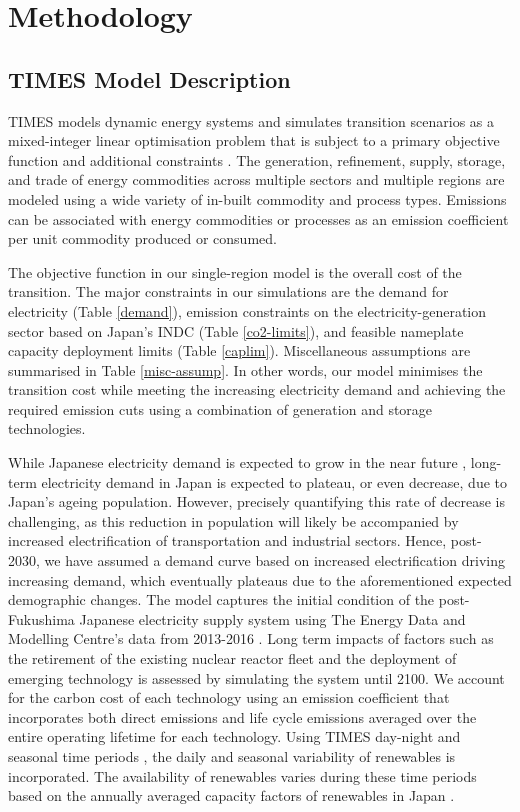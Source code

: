 \section{Methodology} \label{method}
\subsection{TIMES Model Description}
\gls{TIMES} models dynamic energy systems and simulates transition scenarios as a mixed-integer linear optimisation problem that is subject to a primary objective function and additional constraints \cite{loulou_etsap-tiam_2008}. The generation, refinement, supply, storage, and trade of energy commodities across multiple sectors and multiple regions are modeled using a wide variety of in-built commodity and process types. Emissions can be associated with energy commodities or processes as an emission coefficient per unit commodity produced or consumed. 

The objective function in our single-region model is the overall cost of the transition. The major constraints in our simulations are the demand for electricity (Table \ref{demand}), emission constraints on the electricity-generation sector based on Japan's \gls{INDC} (Table \ref{co2-limits}), and feasible nameplate capacity deployment limits (Table \ref{caplim}). Miscellaneous assumptions are summarised in Table \ref{misc-assump}. In other words, our model minimises the transition cost while meeting the increasing electricity demand and achieving the required emission cuts using a combination of generation and storage technologies. 

While Japanese electricity demand is expected to grow in the near future  \cite{noauthor_electricity_2019}, long-term electricity demand in Japan is expected to plateau, or even decrease, due to Japan's ageing population. However, precisely quantifying this rate of decrease is challenging, as this reduction in population will likely be accompanied by increased electrification of transportation and industrial sectors. Hence, post-2030, we have assumed a demand curve based on increased electrification driving increasing demand, which eventually plateaus due to the aforementioned expected demographic changes. The model captures the initial condition of the post-Fukushima Japanese electricity supply system using The Energy Data and Modelling Centre's data from 2013-2016 \cite{the_institute_of_energy_economics_japan_energy_2018}. Long term impacts of factors such as the retirement of the existing nuclear reactor fleet and the deployment of emerging technology is assessed by simulating the system until 2100. We account for the carbon cost of each technology using an emission coefficient that incorporates both direct emissions and life cycle emissions averaged over the entire operating lifetime for each technology. Using \gls{TIMES} day-night and seasonal time periods \cite{loulou_etsap-tiam_2008}, the daily and seasonal variability of renewables is incorporated. The availability of renewables varies during these time periods based on the annually averaged capacity factors of renewables in Japan \cite{the_institute_of_energy_economics_japan_energy_2018, irena_renewable_2020}.

